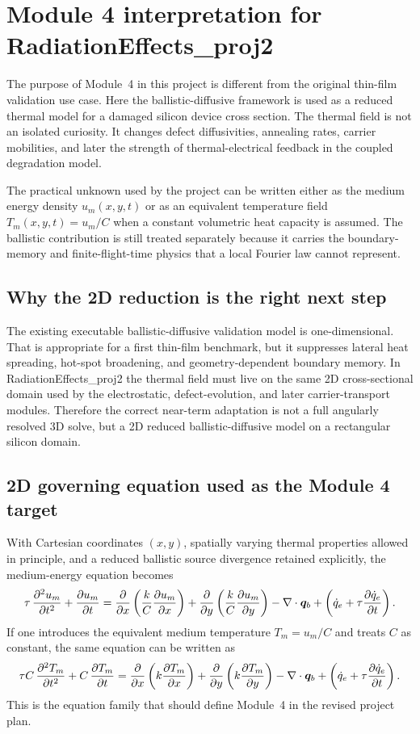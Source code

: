 \documentclass[11pt]{article}
\begin{document}
\section{Module 4 interpretation for RadiationEffects\_proj2}
The purpose of Module~4 in this project is different from the original thin-film validation use case. Here the ballistic-diffusive framework is used as a reduced thermal model for a damaged silicon device cross section. The thermal field is not an isolated curiosity. It changes defect diffusivities, annealing rates, carrier mobilities, and later the strength of thermal-electrical feedback in the coupled degradation model.

The practical unknown used by the project can be written either as the medium energy density $u_m(x,y,t)$ or as an equivalent temperature field $T_m(x,y,t)=u_m/C$ when a constant volumetric heat capacity is assumed. The ballistic contribution is still treated separately because it carries the boundary-memory and finite-flight-time physics that a local Fourier law cannot represent.

\subsection{Why the 2D reduction is the right next step}
The existing executable ballistic-diffusive validation model is one-dimensional. That is appropriate for a first thin-film benchmark, but it suppresses lateral heat spreading, hot-spot broadening, and geometry-dependent boundary memory. In RadiationEffects\_proj2 the thermal field must live on the same 2D cross-sectional domain used by the electrostatic, defect-evolution, and later carrier-transport modules. Therefore the correct near-term adaptation is not a full angularly resolved 3D solve, but a 2D reduced ballistic-diffusive model on a rectangular silicon domain.

\subsection{2D governing equation used as the Module 4 target}
With Cartesian coordinates $(x,y)$, spatially varying thermal properties allowed in principle, and a reduced ballistic source divergence retained explicitly, the medium-energy equation becomes
\begin{equation}
\tau\,\pdv[2]{u_m}{t} + \pdv{u_m}{t}
=
\pdv{}{x}\left(\frac{k}{C}\pdv{u_m}{x}\right)
+
\pdv{}{y}\left(\frac{k}{C}\pdv{u_m}{y}\right)
-
\nabla\cdot\bm{q}_b
+
\left(\dot{q}_e + \tau\pdv{\dot{q}_e}{t}\right).
\label{eq:module4_2d_um}
\end{equation}
If one introduces the equivalent medium temperature $T_m=u_m/C$ and treats $C$ as constant, the same equation can be written as
\begin{equation}
\tau C\,\pdv[2]{T_m}{t} + C\,\pdv{T_m}{t}
=
\pdv{}{x}\left(k\pdv{T_m}{x}\right)
+
\pdv{}{y}\left(k\pdv{T_m}{y}\right)
-
\nabla\cdot\bm{q}_b
+
\left(\dot{q}_e + \tau\pdv{\dot{q}_e}{t}\right).
\label{eq:module4_2d_tm}
\end{equation}
This is the equation family that should define Module~4 in the revised project plan.
\end{document}
